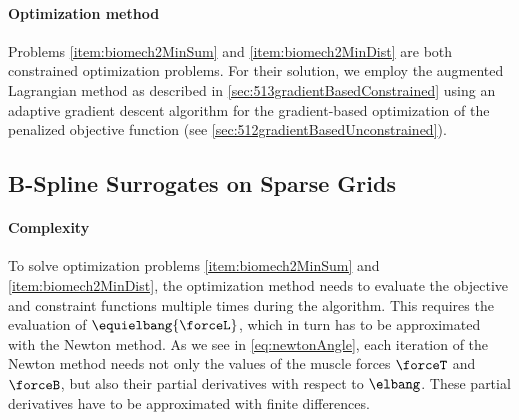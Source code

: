 \paragraph{Optimization method}
%
Problems \ref{item:biomech2MinSum} and \ref{item:biomech2MinDist}
are both constrained optimization problems.
For their solution, we employ the augmented Lagrangian method as
described in \cref{sec:513gradientBasedConstrained}
using an adaptive gradient descent algorithm
for the gradient-based optimization of the penalized objective function
(see \cref{sec:512gradientBasedUnconstrained}).



\subsection{B-Spline Surrogates on Sparse Grids}
\label{sec:723surrogates}

\paragraph{Complexity}

To solve optimization problems
\ref{item:biomech2MinSum} and \ref{item:biomech2MinDist},
the optimization method needs to evaluate the objective
and constraint functions multiple times during the algorithm.
This requires the evaluation of $\equielbang{\forceL}$,
which in turn has to be approximated with the Newton method.
As we see in \cref{eq:newtonAngle},
each iteration of the Newton method needs not only the values of the
muscle forces $\forceT$ and $\forceB$, but also their
partial derivatives with respect to $\elbang$.
These partial derivatives have to be approximated with finite differences.

